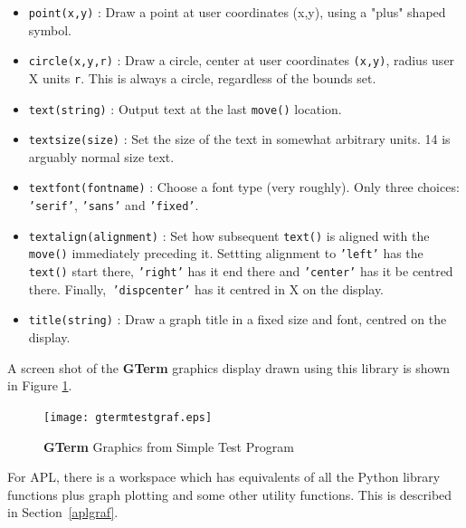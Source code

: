\documentclass[a4paper,twoside,11pt]{article}
\newcommand{\newpara}{\par\vspace{4mm}\noindent}
\begin{document}
\begin{itemize}
\item \texttt{point(x,y)} : Draw a point at user coordinates (x,y), using a "plus" shaped symbol.
\item \texttt{circle(x,y,r)} : Draw a circle, center at user coordinates \texttt{(x,y)}, radius user X units \texttt{r}. 
		This is always a circle, regardless of the bounds set.
\item \texttt{text(string)} : Output text at the last \texttt{move()} location.
\item \texttt{textsize(size)} : Set the size of the text in somewhat arbitrary units. 14 is arguably normal size text.
\item \texttt{textfont(fontname)} : Choose a font type (very roughly). 
        Only three choices: \texttt{'serif'}, \texttt{'sans'} and \texttt{'fixed'}.
\item \texttt{textalign(alignment)} : Set how subsequent \texttt{text()} is aligned with the \texttt{move()} immediately preceding it.
        Settting alignment to \texttt{'left'} has the \texttt{text()} start there, \texttt{'right'} has it end there and
        \texttt{'center'} has it be centred there. Finally,\texttt{ 'dispcenter'} has it centred in X on the display.
\item \texttt{title(string)} : Draw a graph title in a fixed size and font, centred on the display.
\end{itemize}

\noindent A screen shot of the \textbf{GTerm} graphics display drawn using this library is shown in Figure \ref{fig:graf1}.
\begin{figure}
	\centering
		\texttt{[image: gtermtestgraf.eps]}
	\caption{\textbf{GTerm} Graphics from Simple Test Program}
	\label{fig:graf1}
\end{figure}

\newpara
For APL, there is a workspace which has equivalents of all the Python library functions plus graph plotting and some
other utility functions. This is described in Section~\ref{aplgraf}.
\end{document}
